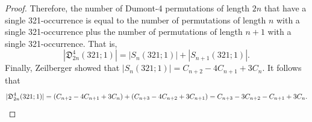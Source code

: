 \documentclass[
final
]{dmtcs-episciences}
\theoremstyle{definition}
\theoremstyle{remark}
\begin{document}
\begin{proof}
%
%

Therefore, the number of Dumont-4 permutations of length $2n$ that have a single 321-occurrence is equal to the number of permutations of length $n$ with a single 321-occurrence plus the number of permutations of length $n+1$ with a single 321-occurrence.  That is, $$|\mathfrak{D}^4_{2n} (321;1)| = |S_n (321;1)| + |S_{n+1} (321;1)|.$$  Finally, Zeilberger \cite {Zeilberger_lovely} showed that $|S_n (321;1)| = C_{n+2} - 4C_{n+1} + 3C_n$.  It follows that 
\[
|\mathfrak{D}^4_{2n} (321;1)| =( C_{n+2} - 4C_{n+1} + 3C_n)+ ( C_{n+3} - 4C_{n+2} + 3C_{n+1})%
= C_{n+3} - 3C_{n+2} - C_{n+1} + 3C_n. \qedhere
\]
\end{proof}
\end{document}
